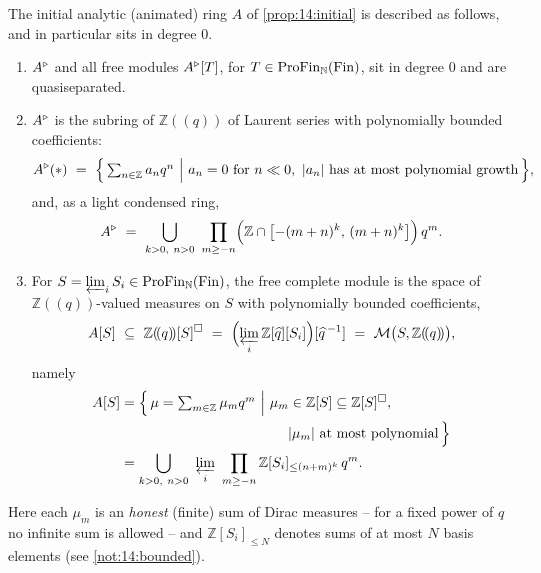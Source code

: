 \begin{theorem}
\label{thm:14:gaseous-base}
The initial analytic (animated) ring $A$ of \cref{prop:14:initial} is described as
follows, and in particular sits in degree $0$.
\begin{enumerate}
\item $A^{\triangleright}$ and all free modules $A^{\triangleright}[T]$, for $T\in\mathrm{ProFin}_{\mathbb{N}}(\mathrm{Fin})$,
sit in degree $0$ and are quasiseparated.
\item $A^{\triangleright}$ is the subring of $\mathbb{Z}(\!(q)\!)$ of Laurent series with
polynomially bounded coefficients:
\begin{equation}
\label{eq:14:A-underlying}
\ur A(\ast)\ =\ \Bigl\{\,\textstyle\sum_{n\in\mathbb{Z}} a_n q^n\ \Big|\ a_n=0\ \text{for}\ n\ll 0,\ |a_n|\ \text{has at most polynomial growth}\,\Bigr\},
\end{equation}
and, as a light condensed ring,
\begin{equation*}
A^{\triangleright}\ =\ \bigcup_{k>0,\ n>0}\ \prod_{m\ge -n}\Bigl(\mathbb{Z}\cap\bigl[-(m+n)^{k},\,(m+n)^{k}\bigr]\Bigr)\,q^{m}.
\end{equation*}
\item For $S=\varprojlim_i S_i\in\mathrm{ProFin}_{\mathbb{N}}(\mathrm{Fin})$, the free
complete module is the space of $\mathbb{Z}((q))$-valued measures on $S$ with
polynomially bounded coefficients,
\begin{equation*}
A[S]\ \subseteq\ \mathbb{Z}(\!(q)\!)[S]^{\solid}\ =\ \Bigl(\varprojlim_i\mathbb{Z}[\widehat{q}][S_i]\Bigr)[\widehat{q}^{\,-1}]\ =\ \Mmeas\bigl(S,\mathbb{Z}(\!(q)\!)\bigr),
\end{equation*}
namely
\begin{equation*}
\begin{aligned}
A[S]&=\Bigl\{\,\mu=\textstyle\sum_{m\in\mathbb{Z}}\mu_m q^m\ \Big|\
\mu_m\in\mathbb{Z}[S]\subseteq\mathbb{Z}[S]^{\solid},\\
&\hspace{12em}|\mu_m|\ \text{at most polynomial}\,\Bigr\}\\
&=\bigcup_{k>0,\ n>0}\ \varprojlim_i\ \prod_{m\ge -n}
\mathbb{Z}[S_i]_{\le (n+m)^{k}}\,q^{m}.
\end{aligned}
\end{equation*}
\end{enumerate}
Here each $\mu_m$ is an \emph{honest} (finite) sum of Dirac measures -- for a fixed
power of $q$ no infinite sum is allowed -- and $\mathbb{Z}[S_i]_{\le N}$ denotes
sums of at most $N$ basis elements (see \cref{not:14:bounded}).
\end{theorem}


